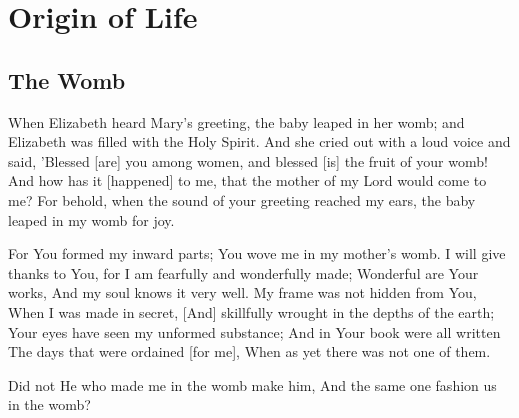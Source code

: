 \chapter{Origin of Life}
\section{The Womb}

\begin{scripture}[Luke 1:41-44]
     
    When Elizabeth heard Mary's greeting, the baby leaped in her womb; and Elizabeth was filled with the Holy Spirit.    
        And she cried out with a loud voice and said, 'Blessed [are] you among women, and blessed [is] the fruit of your womb!
        And how has it [happened] to me, that the mother of my Lord would come to me?
        For behold, when the sound of your greeting reached my ears, the baby leaped in my womb for joy.
 \end{scripture}

\vspace{1\baselineskip}

\begin{scripture}[Psalm 139:13-16]

        
        For You formed my inward parts; You wove me in my mother's womb.  
       I will give thanks to You, for I am fearfully and wonderfully made; Wonderful are Your works, And my soul knows it very well.  
        My frame was not hidden from You, When I was made in secret, [And] skillfully wrought in the depths of the earth;  
        Your eyes have seen my unformed substance; And in Your book were all written The days that were ordained [for me], When as yet there was not one of them.  
\end{scripture}

\vspace{1\baselineskip}

\begin{scripture}[Job 31:15]
    Did not He who made me in the womb make him, And the same one fashion us in the womb?
\end{scripture}

